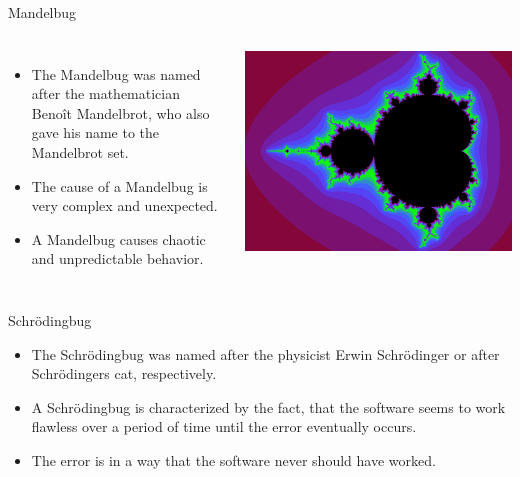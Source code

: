 \begin{frame}{Mandelbug}
\begin{columns}
\begin{itemize}
	\item The Mandelbug was named after the mathematician Benoît Mandelbrot, who also gave his name to the Mandelbrot set.
	\item The cause of a Mandelbug is very complex and unexpected.
	\item A Mandelbug causes chaotic and unpredictable behavior.
\end{itemize}
\includegraphics[width=\textwidth]{content/images/software-quality/mandelbrot.png}
\end{columns}

\end{frame}

\begin{frame}{Schrödingbug}
\begin{itemize}
	\item The Schrödingbug was named after the physicist Erwin Schrödinger or after Schrödingers cat, respectively.
	\item A Schrödingbug is characterized by the fact, that the software seems to work flawless over a period of time until the error eventually occurs.
	\item The error is in a way that the software never should have worked.
\end{itemize}
\end{frame}

